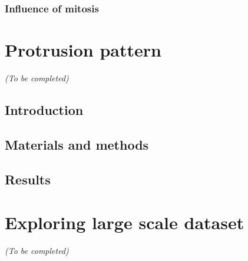 \subsubsection{Influence of mitosis}


\section{Protrusion pattern}
\label{sec:protrusion}

\begin{center}
	\textit{(To be completed)}
\end{center}

\subsection{Introduction}
\label{subsec:introduction_protrusion}

\subsection{Materials and methods}
\label{subsec:materials_protrusion}

\subsection{Results}
\label{subsec:results_protrusion}

\section{Exploring large scale dataset}
\label{sec:exploration}

\begin{center}
	\textit{(To be completed)}
\end{center}



